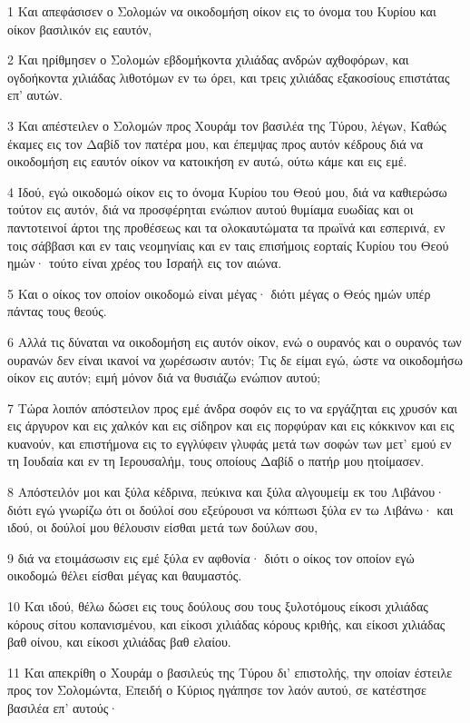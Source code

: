 \par 1 Και απεφάσισεν ο Σολομών να οικοδομήση οίκον εις το όνομα του Κυρίου και οίκον βασιλικόν εις εαυτόν,
\par 2 Και ηρίθμησεν ο Σολομών εβδομήκοντα χιλιάδας ανδρών αχθοφόρων, και ογδοήκοντα χιλιάδας λιθοτόμων εν τω όρει, και τρεις χιλιάδας εξακοσίους επιστάτας επ' αυτών.
\par 3 Και απέστειλεν ο Σολομών προς Χουράμ τον βασιλέα της Τύρου, λέγων, Καθώς έκαμες εις τον Δαβίδ τον πατέρα μου, και έπεμψας προς αυτόν κέδρους διά να οικοδομήση εις εαυτόν οίκον να κατοικήση εν αυτώ, ούτω κάμε και εις εμέ.
\par 4 Ιδού, εγώ οικοδομώ οίκον εις το όνομα Κυρίου του Θεού μου, διά να καθιερώσω τούτον εις αυτόν, διά να προσφέρηται ενώπιον αυτού θυμίαμα ευωδίας και οι παντοτεινοί άρτοι της προθέσεως και τα ολοκαυτώματα τα πρωϊνά και εσπερινά, εν τοις σάββασι και εν ταις νεομηνίαις και εν ταις επισήμοις εορταίς Κυρίου του Θεού ημών· τούτο είναι χρέος του Ισραήλ εις τον αιώνα.
\par 5 Και ο οίκος τον οποίον οικοδομώ είναι μέγας· διότι μέγας ο Θεός ημών υπέρ πάντας τους θεούς.
\par 6 Αλλά τις δύναται να οικοδομήση εις αυτόν οίκον, ενώ ο ουρανός και ο ουρανός των ουρανών δεν είναι ικανοί να χωρέσωσιν αυτόν; Τις δε είμαι εγώ, ώστε να οικοδομήσω οίκον εις αυτόν; ειμή μόνον διά να θυσιάζω ενώπιον αυτού;
\par 7 Τώρα λοιπόν απόστειλον προς εμέ άνδρα σοφόν εις το να εργάζηται εις χρυσόν και εις άργυρον και εις χαλκόν και εις σίδηρον και εις πορφύραν και εις κόκκινον και εις κυανούν, και επιστήμονα εις το εγγλύφειν γλυφάς μετά των σοφών των μετ' εμού εν τη Ιουδαία και εν τη Ιερουσαλήμ, τους οποίους Δαβίδ ο πατήρ μου ητοίμασεν.
\par 8 Απόστειλόν μοι και ξύλα κέδρινα, πεύκινα και ξύλα αλγουμείμ εκ του Λιβάνου· διότι εγώ γνωρίζω ότι οι δούλοί σου εξεύρουσι να κόπτωσι ξύλα εν τω Λιβάνω· και ιδού, οι δούλοί μου θέλουσιν είσθαι μετά των δούλων σου,
\par 9 διά να ετοιμάσωσιν εις εμέ ξύλα εν αφθονία· διότι ο οίκος τον οποίον εγώ οικοδομώ θέλει είσθαι μέγας και θαυμαστός.
\par 10 Και ιδού, θέλω δώσει εις τους δούλους σου τους ξυλοτόμους είκοσι χιλιάδας κόρους σίτου κοπανισμένου, και είκοσι χιλιάδας κόρους κριθής, και είκοσι χιλιάδας βαθ οίνου, και είκοσι χιλιάδας βαθ ελαίου.
\par 11 Και απεκρίθη ο Χουράμ ο βασιλεύς της Τύρου δι' επιστολής, την οποίαν έστειλε προς τον Σολομώντα, Επειδή ο Κύριος ηγάπησε τον λαόν αυτού, σε κατέστησε βασιλέα επ' αυτούς·
